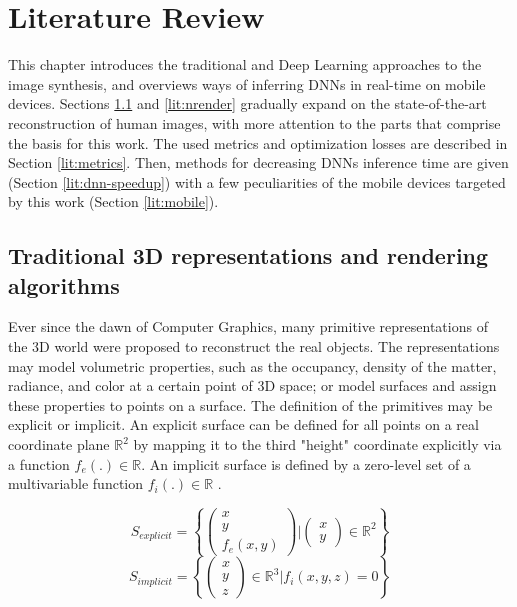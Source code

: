 \chapter{Literature Review}\label{chapter:lit}

This chapter introduces the traditional and Deep Learning approaches to the image synthesis, and overviews ways of inferring DNNs in real-time on mobile devices. Sections \ref{lit:traditional-cg} and \ref{lit:nrender} gradually expand on the state-of-the-art reconstruction of human images, with more attention to the parts that comprise the basis for this work. The used metrics and optimization losses are described in Section \ref{lit:metrics}. Then, methods for decreasing DNNs inference time are given (Section \ref{lit:dnn-speedup}) with a few peculiarities of the mobile devices targeted by this work (Section \ref{lit:mobile}).

\section{Traditional 3D representations and rendering algorithms}
\label{lit:traditional-cg}

Ever since the dawn of Computer Graphics, many primitive representations of the 3D world were proposed to reconstruct the real objects. The representations may model volumetric properties, such as the occupancy, density of the matter, radiance, and color at a certain point of 3D space; or model surfaces and assign these properties to points on a surface. The definition of the primitives may be explicit or implicit. An explicit surface can be defined for all points on a real coordinate plane $\mathbb{R}^2$ by mapping it to the third "height" coordinate explicitly via a function $f_e(.) \in \mathbb{R}$. An implicit surface is defined by a zero-level set of a multivariable function $f_i(.) \in \mathbb{R}$ \cite{survey:advances-nn22}.
\begin{multicols}{2}
\setlength\abovedisplayskip{0pt}
\noindent
\begin{equation}
	\renewcommand\arraystretch{0.6}
	S_{explicit} = \left\{ 
	\left( \begin{array}{c} x \\ y \\ f_{e}(x,y) \end{array} \right) \Bigg\rvert 
	\left( \begin{array}{c} x \\ y \end{array} \right) \in \mathbb{R}^2
	\right\}
\end{equation}
\begin{equation}
	\renewcommand\arraystretch{0.6}
	S_{implicit} = \left\{ \begin{pmatrix} x \\ y \\ z \end{pmatrix} \in \mathbb{R}^3 \Bigg\rvert f_{i}(x, y, z) = 0 \right\}
\end{equation}
\setlength\belowdisplayskip{0pt} 
\end{multicols} 

